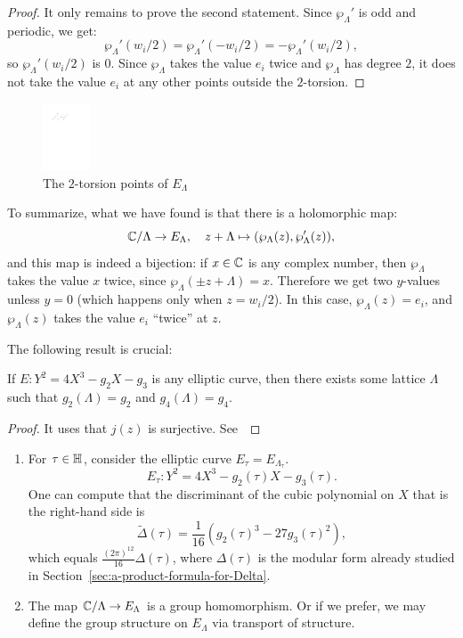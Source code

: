 \begin{proof}
  It only remains to prove the second statement. Since $\wp_\Lambda'$ is odd and periodic, we get:
\[
\wp_\Lambda'(w_i/2) = \wp_\Lambda'(-w_i/2) = -\wp_\Lambda'(w_i/2),
\]
so $\wp_\Lambda'(w_i/2)$ is $0$. Since $\wp_\Lambda$ takes the value $e_i$ twice and $\wp_\Lambda$ has degree $2$, it does not take the value $e_i$ at any other points outside the $2$-torsion.
\end{proof}

\begin{figure}
  \centering
  \includegraphics[height=2cm]{twotorsion.pdf}
  \caption{The $2$-torsion points of $E_\Lambda$}
  \label{fig:two-torsion}
\end{figure}

To summarize, what we have found is that there is a holomorphic map:
\[
\mathbb{C}/\Lambda\to E_\Lambda,\quad z+\Lambda\mapsto (\wp_\Lambda(z),\wp_\Lambda'(z)),
\]
and this map is indeed a bijection: if $x\in\mathbb{C}$ is any complex number, then $\wp_\Lambda$ takes the value $x$ twice, since $\wp_\Lambda(\pm z+\Lambda)=x$. Therefore we get two $y$-values unless $y=0$ (which happens only when $z=w_i/2$). In this case, $\wp_\Lambda(z)=e_i$, and $\wp_\Lambda(z)$ takes the value $e_i$ ``twice'' at $z$.

The following result is crucial:
\begin{theorem}
  If $E\colon Y^2=4X^3-g_2X-g_3$ is any elliptic curve, then there exists some lattice $\Lambda$ such that $g_2(\Lambda)=g_2$ and $g_4(\Lambda)=g_4$.
\end{theorem}
\begin{proof}
It uses that $j(z)$ is surjective. See~\cite[Proposition 1.4.3]{diamond-shurman}
\end{proof}
\begin{remark}
  \begin{enumerate}
  \item For $\tau\in\mathbb{H}$, consider the elliptic curve $E_\tau=E_{\Lambda_\tau}$.
\[
E_\tau\colon Y^2=4X^3-g_2(\tau)X-g_3(\tau).
\]
One can compute that the discriminant of the cubic polynomial on $X$ that is the right-hand side is
\[
\tilde\Delta(\tau) = \frac{1}{16}(g_2(\tau)^3-27g_3(\tau)^2),
\]
which equals $\frac{(2\pi)^{12}}{16}\Delta(\tau)$,
where $\Delta(\tau)$ is the modular form already studied in Section~\ref{sec:a-product-formula-for-Delta}.
\item The map $\mathbb{C}/\Lambda\to E_\Lambda$ is a group homomorphism. Or if we prefer, we may define the group structure on $E_\Lambda$ via transport of structure.
  \end{enumerate}
\end{remark}

